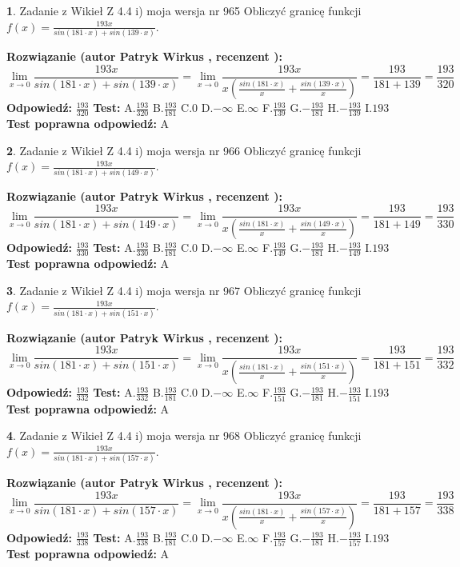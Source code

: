 \documentclass[12pt, a4paper]{article}
\theoremstyle{definition} %
\newtheorem{zad}{}
\newcommand{\zadStart}[1]{\begin{zad}#1\newline}
\newcommand{\zadStop}{\end{zad}}
\newcommand{\rozwStart}[2]{\noindent \textbf{Rozwiązanie (autor #1 , recenzent #2): }\newline}
\newcommand{\rozwStop}{\newline}
\newcommand{\odpStart}{\noindent \textbf{Odpowiedź:}\newline}
\newcommand{\odpStop}{\newline}
\newcommand{\testStart}{\noindent \textbf{Test:}\newline}
\newcommand{\testStop}{\newline}
\newcommand{\kluczStart}{\noindent \textbf{Test poprawna odpowiedź:}\newline}
\newcommand{\kluczStop}{\newline}
\begin{document}
\zadStart{Zadanie z Wikieł Z 4.4 i) moja wersja nr 965}
Obliczyć granicę funkcji $f(x)=\frac{193x}{sin(181\cdot x) +sin(139\cdot x)}$.
\zadStop
\rozwStart{Patryk Wirkus}{}
$$\lim\limits_{x\to 0}\frac{193x}{sin(181\cdot x) +sin(139\cdot x)}=\lim\limits_{x\to 0}\frac{193x}{x(\frac{sin(181\cdot x)}{x}+\frac{sin(139\cdot x)}{x})}=\frac{193}{181+139} = \frac{193}{320}$$
\rozwStop
\odpStart
$\frac{193}{320}$
\odpStop
\testStart
A.$\frac{193}{320}$
B.$\frac{193}{181}$
C.$0$
D.$-\infty$
E.$\infty$
F.$\frac{193}{139}$
G.$-\frac{193}{181}$
H.$-\frac{193}{139}$
I.$193$
\testStop
\kluczStart
A
\kluczStop



\zadStart{Zadanie z Wikieł Z 4.4 i) moja wersja nr 966}
Obliczyć granicę funkcji $f(x)=\frac{193x}{sin(181\cdot x) +sin(149\cdot x)}$.
\zadStop
\rozwStart{Patryk Wirkus}{}
$$\lim\limits_{x\to 0}\frac{193x}{sin(181\cdot x) +sin(149\cdot x)}=\lim\limits_{x\to 0}\frac{193x}{x(\frac{sin(181\cdot x)}{x}+\frac{sin(149\cdot x)}{x})}=\frac{193}{181+149} = \frac{193}{330}$$
\rozwStop
\odpStart
$\frac{193}{330}$
\odpStop
\testStart
A.$\frac{193}{330}$
B.$\frac{193}{181}$
C.$0$
D.$-\infty$
E.$\infty$
F.$\frac{193}{149}$
G.$-\frac{193}{181}$
H.$-\frac{193}{149}$
I.$193$
\testStop
\kluczStart
A
\kluczStop



\zadStart{Zadanie z Wikieł Z 4.4 i) moja wersja nr 967}
Obliczyć granicę funkcji $f(x)=\frac{193x}{sin(181\cdot x) +sin(151\cdot x)}$.
\zadStop
\rozwStart{Patryk Wirkus}{}
$$\lim\limits_{x\to 0}\frac{193x}{sin(181\cdot x) +sin(151\cdot x)}=\lim\limits_{x\to 0}\frac{193x}{x(\frac{sin(181\cdot x)}{x}+\frac{sin(151\cdot x)}{x})}=\frac{193}{181+151} = \frac{193}{332}$$
\rozwStop
\odpStart
$\frac{193}{332}$
\odpStop
\testStart
A.$\frac{193}{332}$
B.$\frac{193}{181}$
C.$0$
D.$-\infty$
E.$\infty$
F.$\frac{193}{151}$
G.$-\frac{193}{181}$
H.$-\frac{193}{151}$
I.$193$
\testStop
\kluczStart
A
\kluczStop



\zadStart{Zadanie z Wikieł Z 4.4 i) moja wersja nr 968}
Obliczyć granicę funkcji $f(x)=\frac{193x}{sin(181\cdot x) +sin(157\cdot x)}$.
\zadStop
\rozwStart{Patryk Wirkus}{}
$$\lim\limits_{x\to 0}\frac{193x}{sin(181\cdot x) +sin(157\cdot x)}=\lim\limits_{x\to 0}\frac{193x}{x(\frac{sin(181\cdot x)}{x}+\frac{sin(157\cdot x)}{x})}=\frac{193}{181+157} = \frac{193}{338}$$
\rozwStop
\odpStart
$\frac{193}{338}$
\odpStop
\testStart
A.$\frac{193}{338}$
B.$\frac{193}{181}$
C.$0$
D.$-\infty$
E.$\infty$
F.$\frac{193}{157}$
G.$-\frac{193}{181}$
H.$-\frac{193}{157}$
I.$193$
\testStop
\kluczStart
A
\kluczStop
\end{document}
